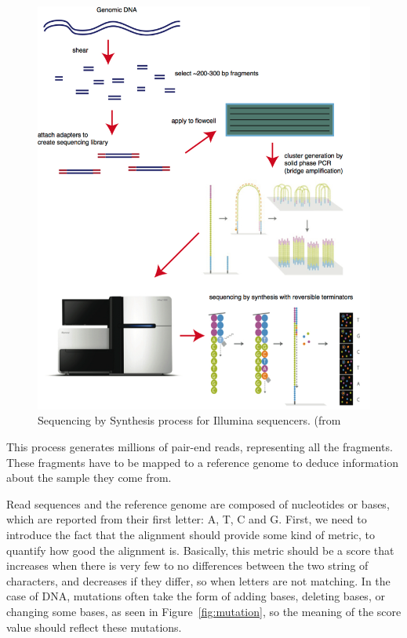 \begin{figure}
    \centering
    \includegraphics{sbs}
    \caption{Sequencing by Synthesis process for Illumina sequencers. (from~\cite{bitesizebio:sbs}}
    \label{fig:sbs}
\end{figure}{}

This process generates millions of pair-end reads, representing all the fragments. These fragments have to be mapped to a reference genome to deduce information about the sample they come from.

Read sequences and the reference genome are composed of nucleotides or bases, which are reported from their first letter: A, T, C and G. First, we need to introduce the fact that the alignment should provide some kind of metric, to quantify how good the alignment is. Basically, this metric should be a score that increases when there is very few to no differences between the two string of characters, and decreases if they differ, so when letters are not matching. In the case of DNA, mutations often take the form of adding bases, deleting bases, or changing some bases, as seen in Figure~\ref{fig:mutation}, so the meaning of the score value should reflect these mutations.

